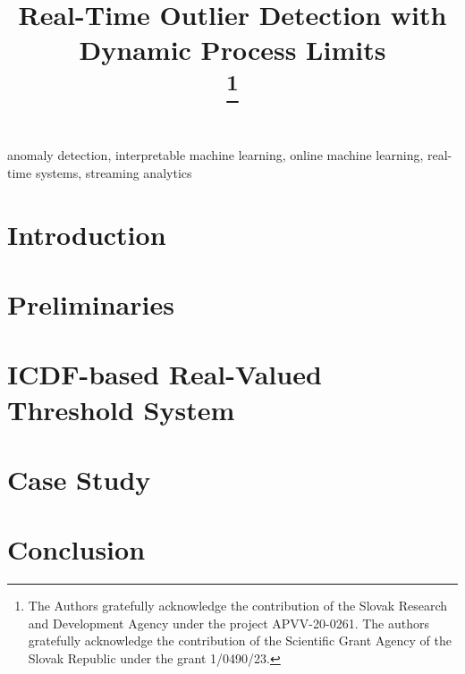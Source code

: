 \documentclass[conference]{IEEEtran}
\begin{document}
\title{Real-Time Outlier Detection with Dynamic Process Limits\\

\thanks{The Authors gratefully acknowledge the contribution of the Slovak Research and Development Agency under the project APVV-20-0261. The authors gratefully acknowledge the contribution of the Scientific Grant Agency of the Slovak Republic under the grant 1/0490/23.}
}

\author{
\and
{}
}

\maketitle

\begin{abstract}

\end{abstract}

\begin{IEEEkeywords}
anomaly detection, interpretable machine learning, online machine learning, real-time systems, streaming analytics
\end{IEEEkeywords}

\section{Introduction}\label{Introduction}


\section{Preliminaries}


\section{ICDF-based Real-Valued Threshold System}


\section{Case Study}


\section{Conclusion}




\end{document}
